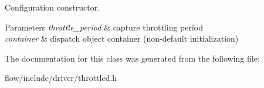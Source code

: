 Configuration constructor. 


\begin{DoxyParams}{Parameters}
{\em throttle\+\_\+period} & capture throttling period \\
\hline
{\em container} & dispatch object container (non-\/default initialization) \\
\hline
\end{DoxyParams}


The documentation for this class was generated from the following file\+:\begin{DoxyCompactItemize}
\item 
flow/include/driver/throttled.\+h\end{DoxyCompactItemize}
